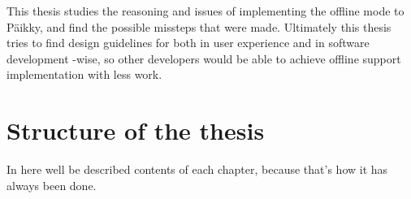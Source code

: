 This thesis studies the reasoning and issues of implementing the offline mode to Päikky, and find the possible missteps that were made. Ultimately this thesis tries to find design guidelines for both in user experience and in software development -wise, so other developers would be able to achieve offline support implementation with less work.



\section{Structure of the thesis}
In here well be described contents of each chapter, because that's how it has always been done.


















